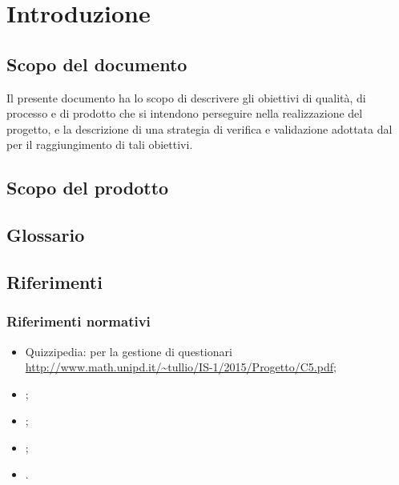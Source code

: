 \documentclass[a4paper, titlepage]{article}
\begin{document}
\pagestyle{fancy}	

\maketitle



\newpage
\tableofcontents
\newpage
\listoftables
\label{lastromanpage}

\newpage
\clearpage	
{}

\hypersetup{linkcolor=blue}
\section{Introduzione}
\subsection{Scopo del documento}
Il presente documento ha lo scopo di descrivere gli obiettivi di qualità, di processo e di prodotto che si intendono perseguire nella realizzazione del progetto, e la descrizione di una strategia di verifica e validazione adottata dal  per il raggiungimento di tali obiettivi.

\subsection{Scopo del prodotto}
\SCOPO

\subsection{Glossario}
\GLOSSARIO

\subsection{Riferimenti}
\subsubsection{Riferimenti normativi}
\begin{itemize}
\item {} Quizzipedia:  per la gestione di questionari
\newline \url{http://www.math.unipd.it/~tullio/IS-1/2015/Progetto/C5.pdf};
\item {} \NdPdoc;
\item {} \AdRdoc;
\item {} \PdPdoc;
\item {} \STdoc.
\end{itemize}
\end{document}
